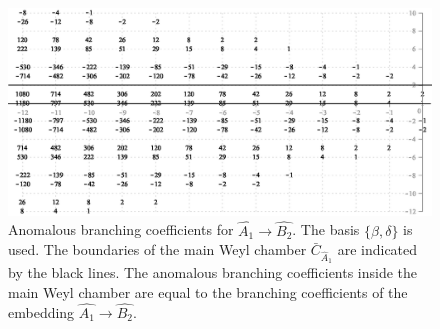\documentclass[12pt]{iopart}
\theoremstyle{definition}
\begin{document}
\begin{figure}[h!bt]
  \centering
  \includegraphics[width=120mm]{figure13.eps}
  \caption{Anomalous branching coefficients for $\hat{A_1}\rightarrow \hat{B_2}$. The basis $\{\beta,\delta\}$ is used.
  The boundaries  of the main Weyl chamber $\bar{C}_{\hat{A}_1}$
 are indicated by the black lines. The anomalous branching coefficients
 inside the main Weyl chamber are equal to the branching coefficients of the embedding $\hat{A_1}\rightarrow \hat{B_2}$.}
  \label{fig:AffineB2_A1_branching}
\end{figure}
\end{document}
